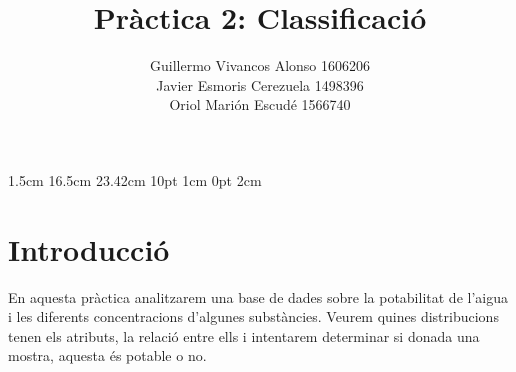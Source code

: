 \documentclass{article}
\title{Pràctica 2: Classificació}
\author{Guillermo Vivancos Alonso 1606206\\
	Javier Esmoris Cerezuela 1498396\\
	Oriol Marión Escudé 1566740}
\begin{document}
	\date{}
	\setmargins{2.5cm}       %
	{1.5cm}                        %
	{16.5cm}                      %
	{23.42cm}                    %
	{10pt}                           %
	{1cm}                           %
	{0pt}                             %
	{2cm}                           %
	
	\pagestyle{fancy}
	\fancyhf{}
	\rfoot{\thepage}
	\maketitle
	\noindent
	\section*{Introducció}
	En aquesta pràctica analitzarem una base de dades sobre la potabilitat de l'aigua i les diferents concentracions d'algunes substàncies. Veurem quines distribucions tenen els atributs, la relació entre ells i intentarem determinar si donada una mostra, aquesta és potable o no.
	
\end{document}
